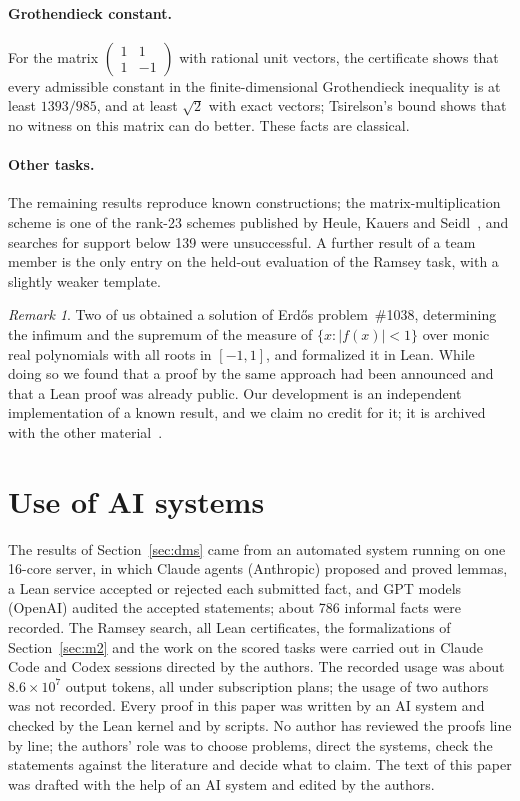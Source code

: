 \documentclass[11pt,a4paper]{article}
\theoremstyle{remark}
\newtheorem*{remark}{Remark}
\begin{document}
\paragraph{Grothendieck constant.}
For the matrix $\left(\begin{smallmatrix}1&1\\1&-1\end{smallmatrix}\right)$ with rational unit vectors, the
certificate shows that every admissible constant in the finite-dimensional Grothendieck inequality is at least
$1393/985$, and at least $\sqrt2$ with exact vectors; Tsirelson's bound shows that no witness on this matrix can do
better. These facts are classical.

\paragraph{Other tasks.}
The remaining results reproduce known constructions; the matrix-multiplication scheme is one of the rank-23 schemes published by
Heule, Kauers and Seidl~\cite{hks}, and searches for support below 139 were unsuccessful. A further result of a team
member is the only entry on the held-out evaluation of the Ramsey task, with a slightly weaker template.

\begin{remark}
Two of us obtained a solution of Erd\H{o}s problem~\#1038, determining the infimum and the supremum of the measure of
$\{x:|f(x)|<1\}$ over monic real polynomials with all roots in $[-1,1]$, and formalized it in Lean. While doing so we
found that a proof by the same approach had been announced and that a Lean proof was already public. Our development
is an independent implementation of a known result, and we claim no credit for it; it is archived with the other
material~\cite{repo}.
\end{remark}

\section{Use of AI systems}\label{sec:ai}

The results of Section~\ref{sec:dms} came from an automated system running on one 16-core server, in which Claude
agents (Anthropic) proposed and proved lemmas, a Lean service accepted or rejected each submitted fact, and GPT models
(OpenAI) audited the accepted statements; about 786 informal facts were recorded. The Ramsey search, all Lean
certificates, the formalizations of Section~\ref{sec:m2} and the work on the scored tasks were carried out in Claude
Code and Codex sessions directed by the authors. The recorded usage was about $8.6\times10^7$ output tokens, all under
subscription plans; the usage of two authors was not recorded. Every proof in this paper was written by an AI system
and checked by the Lean kernel and by scripts. No author has reviewed the proofs line by line; the authors' role was
to choose problems, direct the systems, check the statements against the literature and decide what to claim. The
text of this paper was drafted with the help of an AI system and edited by the authors.
\end{document}
